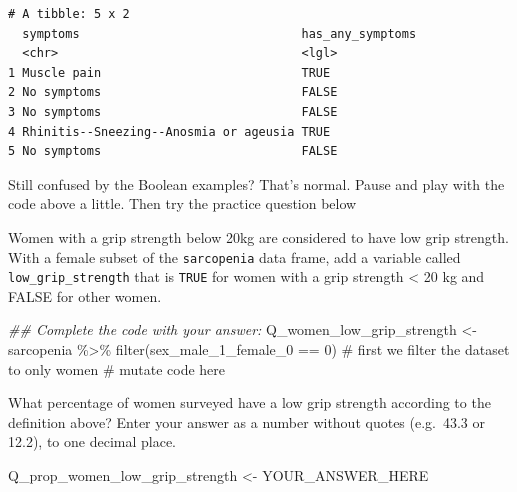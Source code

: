 \documentclass[
  letterpaper,
  DIV=11,
  numbers=noendperiod]{scrreprt}
\newenvironment{Shaded}{\begin{snugshade}}{\end{snugshade}}
\newcommand{\CommentTok}[1]{\textcolor[rgb]{0.37,0.37,0.37}{#1}}
\newcommand{\DecValTok}[1]{\textcolor[rgb]{0.68,0.00,0.00}{#1}}
\newcommand{\DocumentationTok}[1]{\textcolor[rgb]{0.37,0.37,0.37}{\textit{#1}}}
\newcommand{\FunctionTok}[1]{\textcolor[rgb]{0.28,0.35,0.67}{#1}}
\newcommand{\NormalTok}[1]{\textcolor[rgb]{0.00,0.23,0.31}{#1}}
\newcommand{\OtherTok}[1]{\textcolor[rgb]{0.00,0.23,0.31}{#1}}
\newcommand{\SpecialCharTok}[1]{\textcolor[rgb]{0.37,0.37,0.37}{#1}}
\begin{document}
\begin{verbatim}
# A tibble: 5 x 2
  symptoms                               has_any_symptoms
  <chr>                                  <lgl>           
1 Muscle pain                            TRUE            
2 No symptoms                            FALSE           
3 No symptoms                            FALSE           
4 Rhinitis--Sneezing--Anosmia or ageusia TRUE            
5 No symptoms                            FALSE           
\end{verbatim}

Still confused by the Boolean examples? That's normal. Pause and play
with the code above a little. Then try the practice question below

\begin{tcolorbox}[enhanced jigsaw, title=\textcolor{quarto-callout-tip-color}{\faLightbulb}\hspace{0.5em}{Practice}, colbacktitle=quarto-callout-tip-color!10!white, leftrule=.75mm, arc=.35mm, opacityback=0, bottomrule=.15mm, rightrule=.15mm, toptitle=1mm, breakable, toprule=.15mm, colback=white, coltitle=black, colframe=quarto-callout-tip-color-frame, bottomtitle=1mm, titlerule=0mm, left=2mm, opacitybacktitle=0.6]

Women with a grip strength below 20kg are considered to have low grip
strength. With a female subset of the \texttt{sarcopenia} data frame,
add a variable called \texttt{low\_grip\_strength} that is \texttt{TRUE}
for women with a grip strength \textless{} 20 kg and FALSE for other
women.

\begin{Shaded}
\begin{Highlighting}[]
\DocumentationTok{\#\# Complete the code with your answer:}
\NormalTok{Q\_women\_low\_grip\_strength }\OtherTok{\textless{}{-}} 
\NormalTok{  sarcopenia }\SpecialCharTok{\%\textgreater{}\%} 
  \FunctionTok{filter}\NormalTok{(sex\_male\_1\_female\_0 }\SpecialCharTok{==} \DecValTok{0}\NormalTok{) }\CommentTok{\# first we filter the dataset to only women}
  \CommentTok{\# mutate code here}
\end{Highlighting}
\end{Shaded}

What percentage of women surveyed have a low grip strength according to
the definition above? Enter your answer as a number without quotes
(e.g.~43.3 or 12.2), to one decimal place.

\begin{Shaded}
\begin{Highlighting}[]
\NormalTok{Q\_prop\_women\_low\_grip\_strength }\OtherTok{\textless{}{-}}\NormalTok{ YOUR\_ANSWER\_HERE}
\end{Highlighting}
\end{Shaded}

\end{tcolorbox}
\end{document}
